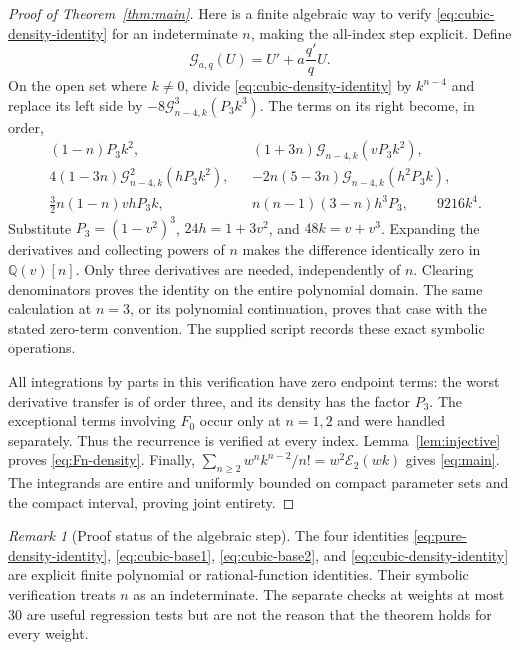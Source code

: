 \documentclass[11pt]{article}
\numberwithin{equation}{section}
\theoremstyle{definition}\newtheorem{definition}[theorem]{Definition}
\theoremstyle{remark}\newtheorem{remark}[theorem]{Remark}
\newcommand{\Q}{\mathbb Q}\newcommand{\C}{\mathbb C}
\newcommand{\Erem}{\mathcal E_2}
\begin{document}
\begin{proof}[Proof of Theorem~\ref{thm:main}]
Here is a finite algebraic way to verify \eqref{eq:cubic-density-identity}
for an indeterminate $n$, making the all-index step explicit. Define
\[
 \mathcal G_{a,q}(U)=U'+a\frac{q'}qU.
\]
On the open set where $k\ne0$, divide \eqref{eq:cubic-density-identity}
by $k^{n-4}$ and replace its left side by
$-8\mathcal G_{n-4,k}^3(P_3k^3)$. The terms on its right become,
in order,
\begin{align*}
 &(1-n)P_3k^2,
 &&(1+3n)\mathcal G_{n-4,k}(vP_3k^2),\\
 &4(1-3n)\mathcal G_{n-4,k}^2(hP_3k^2),
 &&-2n(5-3n)\mathcal G_{n-4,k}(h^2P_3k),\\
 &\tfrac32n(1-n)vhP_3k,
 &&n(n-1)(3-n)h^3P_3,
 \qquad 9216k^4.
\end{align*}
Substitute $P_3=(1-v^2)^3$, $24h=1+3v^2$, and $48k=v+v^3$.
Expanding the derivatives and collecting powers of $n$ makes the
difference identically zero in $\Q(v)[n]$. Only three derivatives are
needed, independently of $n$. Clearing denominators proves the identity
on the entire polynomial domain. The same calculation at $n=3$, or its
polynomial continuation, proves that case with the stated zero-term
convention. The supplied script records these exact symbolic operations.

All integrations by parts in this verification have zero endpoint terms:
the worst derivative transfer is of order three, and its density has the
factor $P_3$. The exceptional terms involving $F_0$ occur only at
$n=1,2$ and were handled separately. Thus the recurrence is verified at
every index. Lemma~\ref{lem:injective} proves
\eqref{eq:Fn-density}. Finally,
$\sum_{n\ge2}w^nk^{n-2}/n!=w^2\Erem(wk)$ gives
\eqref{eq:main}. The integrands are entire and uniformly bounded on
compact parameter sets and the compact interval, proving joint entirety.
\end{proof}

\begin{remark}[Proof status of the algebraic step]
The four identities \eqref{eq:pure-density-identity},
\eqref{eq:cubic-base1}, \eqref{eq:cubic-base2}, and
\eqref{eq:cubic-density-identity} are explicit finite polynomial or
rational-function identities. Their symbolic verification treats $n$ as
an indeterminate. The separate checks at weights at most 30 are useful
regression tests but are not the reason that the theorem holds for every
weight.
\end{remark}


\end{document}
